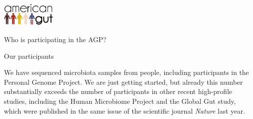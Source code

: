 \documentclass[10pt,letterpaper]{article}
\begin{document}
\parbox{4.5cm}{
	\includegraphics[width=0.2\textwidth]{pdfs-mod1/logoshape.pdf}
}
\parbox{14cm}{
	\fontsize{20pt}{24pt}\selectfont
	Who is participating in the AGP?
}

\colorbox{agpMustard}{\parbox{\textwidth}{\vspace{1mm} \LARGE \centering Our participants \vspace{1mm}}}

We have sequenced \numSamples{} microbiota samples from \numParticipants{} people, including \pgpParticipants{} participants in the Personal Genome Project. We are just getting started, but already this number substantially exceeds the number of participants in other recent high-profile studies, including the Human Microbiome Project and the Global Gut study, which were published in the same issue of the scientific journal {\em Nature} last year.
\end{document}
